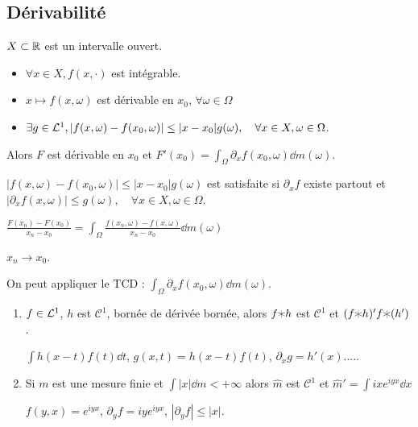 \documentclass[10pt,a4paper,notitlepage ]{report}
\begin{document}
\subsection{Dérivabilité}
$X\subset \mathbb R$ est un intervalle ouvert.
\begin{theorem}
	\begin{itemize}
		\item $\forall x\in X, f(x,\cdot)$ est intégrable.
		\item $x\mapsto f(x,\omega)$ est dérivable en $x_0$, $\forall \omega\in\Omega$
		\item $\exists g\in \mathcal L^1, |f(x,\omega)-f(x_0,\omega)| \le |x-x_0|g(\omega), \quad \forall x\in X, \omega \in \Omega$.
	\end{itemize}
	Alors $F$ est dérivable en $x_0$ et $F'(x_0) = \int_\Omega\partial_xf(x_0,\omega)\dd m(\omega)$.
\end{theorem}
\begin{rem}
	$|f(x,\omega)-f(x_0,\omega)|\le |x-x_0|g(\omega)$ est satisfaite si $\partial_xf$ existe partout et $|\partial_xf(x,\omega)|\le g(\omega), \quad \forall x\in X, \omega \in \Omega$.
\end{rem}
\begin{demo}
	$\frac{F(x_n)-F(x_0)}{x_n-x_0} = \int_\Omega \frac{f(x_n,\omega)-f(x,\omega)}{x_n-x_0} \dd m(\omega)$
	
	$x_n \rightarrow x_0$.
	
	On peut appliquer le TCD : $\int_\Omega \partial_x f(x_0,\omega)\dd m(\omega)$.
\end{demo}

\begin{exemple}
	\begin{enumerate}
		\item $f\in \mathcal L^1$, $h$ est $\mathcal C^1$, bornée de dérivée bornée, alors $f\varhexstar h$ est $\mathcal C^1$ et $(f\varhexstar h)'f\varhexstar (h')$.
		\begin{demo}
			$\int h(x-t)f(t)\dd t$, $g(x,t)=h(x-t)f(t)$, $\partial_x g = h'(x).....$
		\end{demo}
		\item Si $m$ est une mesure finie et $\int |x| \dd m < +\infty$ alors $\hat m$ est $\mathcal C^1$ et $\hat m' = \int ixe^{iyx}\dd x$
		\begin{demo}
			$f(y,x) = e^{iyx}$, $\partial_y f = iye^{iyx}$, $|\partial_y f| \le |x|$.
		\end{demo}
	\end{enumerate}
\end{exemple}
\end{document}
